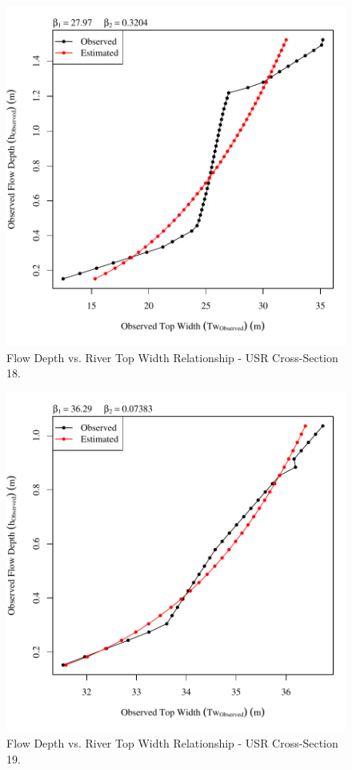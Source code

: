 \begin{center}
\begin{figure}[htbp]
	\includegraphics[width=6in]{"Figures/Results_USR/Survey Tw vs H-Section 18"}
	\caption{Flow Depth vs. River Top Width Relationship - USR Cross-Section 18.}
\end{figure}
\end{center}
\newpage

\begin{center}
\begin{figure}[htbp]
	\includegraphics[width=6in]{"Figures/Results_USR/Survey Tw vs H-Section 19"}
	\caption{Flow Depth vs. River Top Width Relationship - USR Cross-Section 19.}
\end{figure}
\end{center}
\newpage

